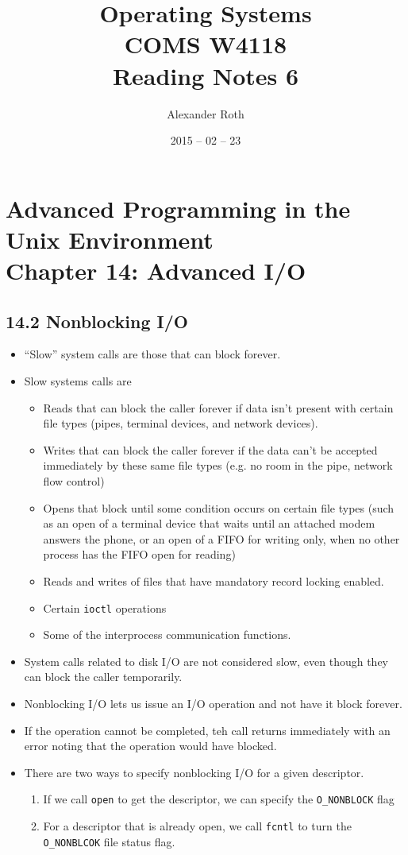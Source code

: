 \documentclass[]{article}
\begin{document}
\newcommand{\code}{\texttt}
\newtheorem{thm}{Theorem}
\title{Operating Systems \\ COMS W4118 \\ Reading Notes 6}
\author{Alexander Roth}
\date{2015 -- 02 -- 23}
\maketitle

\section*{Advanced Programming in the Unix Environment \\
Chapter 14: Advanced I/O}

\subsection*{14.2 Nonblocking I/O}
\begin{itemize}
\item ``Slow'' system calls are those that can block forever.
\item Slow systems calls are
\begin{itemize}
\item Reads that can block the caller forever if data isn't present with certain
file types (pipes, terminal devices, and network devices).
\item Writes that can block the caller forever if the data can't be accepted
immediately by these same file types (e.g. no room in the pipe, network flow
control)
\item Opens that block until some condition occurs on certain file types (such
as an open of a terminal device that waits until an attached modem answers the
phone, or an open of a FIFO for writing only, when no other process has the FIFO
open for reading)
\item Reads and writes of files that have mandatory record locking enabled.
\item Certain \code{ioctl} operations
\item Some of the interprocess communication functions.
\end{itemize}
\item System calls related to disk I/O are not considered slow, even though they
can block the caller temporarily.
\item Nonblocking I/O lets us issue an I/O operation and not have it block
forever.
\item If the operation cannot be completed, teh call returns immediately with an
error noting that the operation would have blocked.
\item There are two ways to specify nonblocking I/O for a given descriptor.
\begin{enumerate}
\item If we call \code{open} to get the descriptor, we can specify the
\code{O\_NONBLOCK} flag
\item For a descriptor that is already open, we call \code{fcntl} to turn the
\code{O\_NONBLCOK} file status flag.
\end{enumerate}
\end{itemize}
\end{document}
